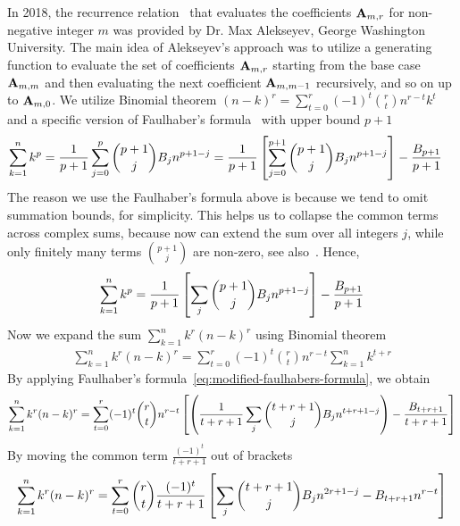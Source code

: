 In 2018, the recurrence relation~\cite{alekseyev2018mathoverflow} that evaluates the coefficients ${\mathbf{A}} \sb{m,r}$ for
non-negative integer $m$ was provided by Dr. Max Alekseyev, George Washington University.
The main idea of Alekseyev's approach was to utilize a generating function to evaluate the set of coefficients ${\mathbf{A}} \sb{m,r}$
starting from the base case ${\mathbf{A}} \sb{m,m}$ and then evaluating the next coefficient ${\mathbf{A}} \sb{m,m-1}$
recursively, and so on up to ${\mathbf{A}} \sb{m,0}$.
We utilize Binomial theorem $(n-k)^r=\sum_{t=0}^{r} (-1)^t \binom{r}{t} n^{r-t} k^t$ and a specific version
of Faulhaber's formula~\cite{beardon1996sums} with upper bound $p+1$
\begin{align*}
    \sum_{k=1}^{n} k^{p}
    = \frac{1}{p+1}\sum_{j=0}^{p} \binom{p+1}{j} {B}\sb{j} n^{p+1-j}
    &= \frac{1}{p+1} \left[ \sum_{j=0}^{p+1} \binom{p+1}{j} {B}\sb{j} n^{p+1-j} \right] - \frac{{B}\sb{p+1}}{p+1}
\end{align*}
The reason we use the Faulhaber's formula above is because we tend to omit summation bounds, for simplicity.
This helps us to collapse the common terms across complex sums, because now can extend the sum over all integers $j$,
while only finitely many terms $\binom{p+1}{j}$ are non-zero, see also~\cite{knuth1992two}.
Hence,
\begin{align}
    \label{eq:modified-faulhabers-formula}
    \sum_{k=1}^{n} k^{p}
    = \frac{1}{p+1} \left[ \sum_{j} \binom{p+1}{j} {B}\sb{j} n^{p+1-j} \right] - \frac{{B}\sb{p+1}}{p+1}
\end{align}
Now we expand the sum $\sum_{k=1}^{n} k^{r} (n-k)^{r}$ using Binomial theorem
\begin{align*}
    \sum_{k=1}^{n} k^{r} (n-k)^{r} = \sum_{t=0}^{r} (-1)^t \binom{r}{t} n^{r-t} \sum_{k=1}^{n} k^{t+r}
\end{align*}
By applying Faulhaber's formula~\eqref{eq:modified-faulhabers-formula}, we obtain
\begin{align*}
    \sum_{k=1}^{n} k^{r} (n-k)^{r}
    = \sum_{t=0}^{r} (-1)^t \binom{r}{t} n^{r-t} \left[ \left( \frac{1}{t+r+1} \sum_{j} \binom{t+r+1}{j} {B}\sb{j} n^{t+r+1-j} \right) - \frac{{B}\sb{t+r+1}}{t+r+1} \right]
\end{align*}
By moving the common term $\frac{(-1)^t}{t+r+1}$ out of brackets
\begin{align*}
    \sum_{k=1}^{n} k^{r} (n-k)^{r}
    = \sum_{t=0}^{r} \binom{r}{t} \frac{(-1)^t}{t+r+1} \left[ \sum_{j} \binom{t+r+1}{j} {B}\sb{j} n^{2r+1-j} - {B}\sb{t+r+1} n^{r-t} \right]
\end{align*}
